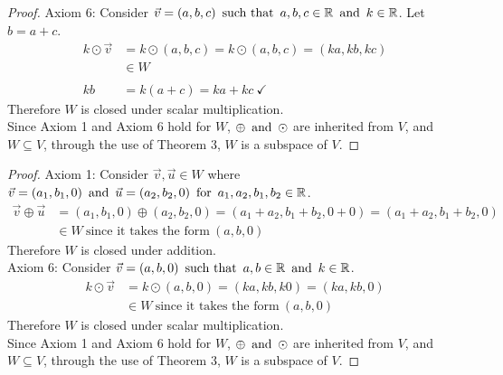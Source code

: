 \begin{enumerate}
\begin{proof}
    Axiom 6: Consider $\vec{v} = (a,b,c) \operatorname{~\text{such that}~} a,b,c \in \mathbb{R} \operatorname{~\text{and}~} k \in \mathbb{R}$. Let $b = a+c$.
    \begin{align*}
      k \odot \vec{v} & = k \odot (a,b,c) = k \odot (a,b,c) = (ka, kb, kc) \\
                      & \in W                                              \\ \\
      kb              & = k(a+c) = ka + kc~\checkmark
    \end{align*}
    Therefore $W$ is closed under scalar multiplication. \\
    Since Axiom 1 and Axiom 6 hold for $W$, $\oplus \operatorname{~\text{and}~} \odot$ are inherited from $V$, and $W \subseteq V$, through the use of Theorem 3, $W$ is a subspace of $V$.
  \end{proof}
  \begin{proof}
    Axiom 1: Consider $\vec{v},\vec{u} \in W$ where $\vec{v} = (a_1,b_1,0) \operatorname{~\text{and}~} \vec{u} = (a_2,b_2,0) \operatorname{~\text{for}~} a_1,a_2,b_1,b_2 \in \mathbb{R}$.
    \begin{align*}
      \vec{v} \oplus \vec{u} & = (a_1,b_1,0) \oplus (a_2,b_2,0) = (a_1+a_2,b_1+b_2,0+0) = (a_1+a_2,b_1+b_2,0) \\
                             & \in W~\text{since it takes the form}~(a,b,0)
    \end{align*}
    Therefore $W$ is closed under addition. \\
    Axiom 6: Consider $\vec{v} = (a,b,0) \operatorname{~\text{such that}~} a,b \in \mathbb{R} \operatorname{~\text{and}~} k \in \mathbb{R}$.
    \begin{align*}
      k \odot \vec{v} & = k \odot (a,b,0) = (ka,kb,k0) = (ka,kb,0)   \\
                      & \in W~\text{since it takes the form}~(a,b,0)
    \end{align*}
    Therefore $W$ is closed under scalar multiplication. \\
    Since Axiom 1 and Axiom 6 hold for $W$, $\oplus \operatorname{~\text{and}~} \odot$ are inherited from $V$, and $W \subseteq V$, through the use of Theorem 3, $W$ is a subspace of $V$.
  \end{proof}
\end{enumerate}

